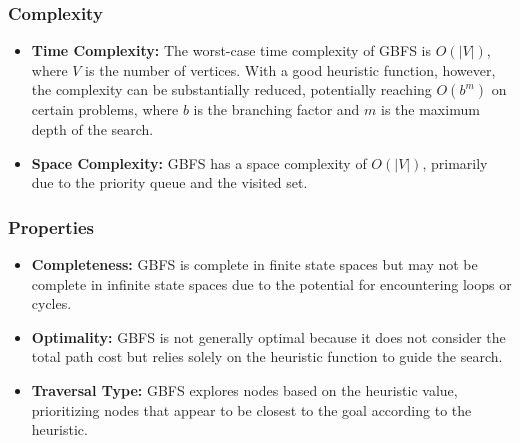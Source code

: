 \subsubsection*{Complexity}
\begin{itemize}
    \item \textbf{Time Complexity:} The worst-case time complexity of GBFS is \( O(|V|) \), where \( V \) is the number of vertices. With a good heuristic function, however, the complexity can be substantially reduced, potentially reaching \( O(b^m) \) on certain problems, where \( b \) is the branching factor and \( m \) is the maximum depth of the search.
    \item \textbf{Space Complexity:} GBFS has a space complexity of \( O(|V|) \), primarily due to the priority queue and the visited set.
\end{itemize}

\subsubsection*{Properties}
\begin{itemize}
    \item \textbf{Completeness:} GBFS is complete in finite state spaces but may not be complete in infinite state spaces due to the potential for encountering loops or cycles.
    \item \textbf{Optimality:} GBFS is not generally optimal because it does not consider the total path cost but relies solely on the heuristic function to guide the search.
    \item \textbf{Traversal Type:} GBFS explores nodes based on the heuristic value, prioritizing nodes that appear to be closest to the goal according to the heuristic.
\end{itemize}
